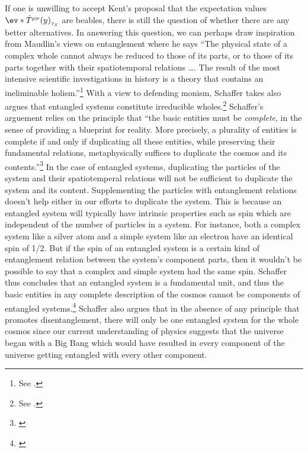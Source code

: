 If one is unwilling to accept Kent's proposal that the expectation values $\ev*{\hat{T}^{\mu\nu}(y)}_{\tau_S}$ are beables, there is still the question of whether there are any better alternatives. In answering this question, we can perhaps draw inspiration from Maudlin's views on entanglement where he says ``The physical state of a complex whole cannot always be reduced to those of its parts, or to those of its parts together with their spatiotemporal relations \ldots. The result of the most intensive scientific investigations in history is a theory that contains an ineliminable holism.''\footnote{See \cite[56]{Maudlin2}.}  With a view to defending monism, Schaffer takes also argues that entangled systems constitute irreducible wholes.\footnote{See \cite{SchafferJonathan2010MTPo}.} Schaffer's arguement relies on the principle that ``the basic entities must be \emph{complete}, in the sense of providing a blueprint for reality. More precisely, a plurality of entities is complete if and only if duplicating all these entities, while preserving their fundamental relations, metaphysically suffices to duplicate the cosmos and its contents.''\footnote{\cite[39]{SchafferJonathan2010MTPo}} In the case of entangled systems, duplicating the particles of the system and their spatiotemperal relations will not be sufficient to duplicate the system and its content. Supplementing the particles with entanglement relations doesn't help either in our efforts to duplicate the system. This is because an entangled system will typically have intrinsic properties such as spin which are independent of the number of particles in a system. For instance, both a complex system like a silver atom and a simple system like an electron have an identical spin of 1/2. But if the spin of an entangled system is a certain kind of entanglement relation between the system's component parts, then it wouldn't be possible to say that a complex and simple system had the same spin. Schaffer thus concludes that an entangled system is a fundamental unit, and thus the basic entities in any complete description of the cosmos cannot be components of entangled systems.\footnote{\cite[54]{SchafferJonathan2010MTPo}}  Schaffer also argues that in the absence of any principle that promotes disentanglement, there will only be one entangled system for the whole cosmos since our current understanding of physics suggests that the universe began with a Big Bang which would have resulted in every component of the universe getting entangled with every other component.

